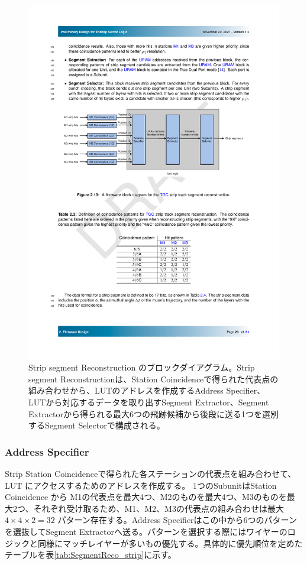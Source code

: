 \begin{figure} 
\centering
\includegraphics[width=16cm]{fig/SL/SegReco_strip.pdf}
\caption[Strip segment Reconstruction のブロックダイアグラム]{Strip segment Reconstruction のブロックダイアグラム\cite{SLPDR}。Strip segment Reconstructionは、Station Coincidenceで得られた代表点の組み合わせから、LUTのアドレスを作成するAddress Specifier、LUTから対応するデータを取り出すSegment Extractor、Segment Extractorから得られる最大6つの飛跡候補から後段に送る1つを選別するSegment Selectorで構成される。}
\label{SegReco_strip}
\end{figure}

\subsubsection*{Address Specifier}
Strip Station Coincidenceで得られた各ステーションの代表点を組み合わせて、LUT にアクセスするためのアドレスを作成する。
1つのSubunitはStation Coincidence から M1の代表点を最大4つ、M2のものを最大4つ、M3のものを最大2つ、それぞれ受け取るため、M1、M2、M3の代表点の組み合わせは最大$4 \times 4 \times 2 = 32$ パターン存在する。Address Specifierはこの中から6つのパターンを選抜してSegment Extractorへ送る。パターンを選択する際にはワイヤーのロジックと同様にマッチレイヤーが多いもの優先する。具体的に優先順位を定めたテーブルを表\ref{tab:SegmentReco_strip}に示す。

